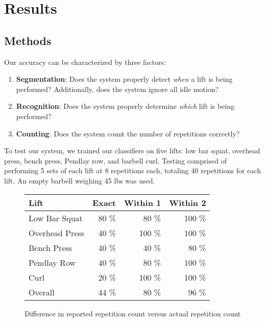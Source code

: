 \chapter{Results}


\section{Methods}
Our accuracy can be characterized by three factors:

\begin{enumerate}
    \item \textbf{Segmentation}: Does the system properly detect \textit{when} a lift is being performed? Additionally, does the system ignore all idle motion?
    \item \textbf{Recognition}: Does the system properly determine \textit{which} lift is being performed?
    \item \textbf{Counting}: Does the system count the number of repetitions correctly?
\end{enumerate}

To test our system, we trained our classifiers on five lifts: low bar squat, overhead press, bench press, Pendlay row, and barbell curl. Testing comprised of performing 5 sets of each lift at 8 repetitions each, totaling 40 repetitions for each lift. An empty barbell weighing 45 lbs was used. 

\begin{figure}
    \centering
    \begin{tabular}{l r r r}
        \toprule
        Lift           & Exact   & Within 1 & Within 2 \\
        \midrule[\heavyrulewidth]
        Low Bar Squat  & 80 \%    & 80 \%     & 100 \% \\
        Overhead Press & 40 \%    & 100 \%    & 100 \% \\
        Bench Press    & 40 \%    & 40 \%     & 80 \%  \\
        Pendlay Row    & 40 \%    & 80 \%     & 100 \% \\
        Curl           & 20 \%    & 100 \%    & 100 \% \\
        \midrule
        Overall        & 44 \%   & 80 \%      & 96 \%  \\
        \bottomrule
    \end{tabular}
    \caption{Difference in reported repetition count versus actual repetition count}
\end{figure}

